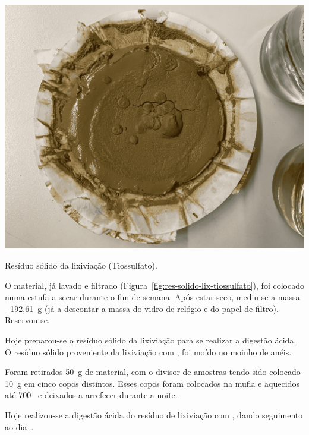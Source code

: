 \begin{marginfigure}
    \centering
    \includegraphics[width=0.9\linewidth]{figures/residuo_sol_lix_tiossulfato}
    \caption{Resíduo sólido da lixiviação (Tiossulfato).}
    \label{fig:res-solido-lix-tiossulfato}
\end{marginfigure}

O material, já lavado e filtrado (Figura~\ref{fig:res-solido-lix-tiossulfato}), foi colocado numa estufa a secar durante o fim-de-semana.
Após estar seco, mediu-se a massa - 192,61~g (já a descontar a massa do vidro de relógio e do papel de filtro).
Reservou-se.

\hrulefill


\label{day:19-novembro-2024}

Hoje preparou-se o resíduo sólido da lixiviação para se realizar a digestão ácida.
O resíduo sólido proveniente da lixiviação com \TSP{}, foi moído no moinho de anéis.

Foram retirados 50~g de material, com o divisor de amostras tendo sido colocado 10~g em cinco copos distintos.
Esses copos foram colocados na mufla e aquecidos até 700~\graus{} e deixados a arrefecer durante a noite.


\hrulefill

\newpage


Hoje realizou-se a digestão ácida do resíduo de lixiviação com \TSP{}, dando seguimento ao dia~.


